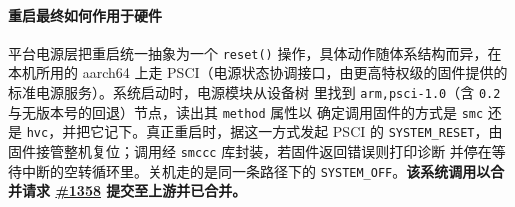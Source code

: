 \paragraph{重启最终如何作用于硬件}
平台电源层把重启统一抽象为一个 \texttt{reset()} 操作，具体动作随体系结构而异，在本机所用的 aarch64
上走 PSCI（电源状态协调接口，由更高特权级的固件提供的标准电源服务）。系统启动时，电源模块从设备树
里找到 \texttt{arm,psci-1.0}（含 \texttt{0.2} 与无版本号的回退）节点，读出其 \texttt{method} 属性以
确定调用固件的方式是 \texttt{smc} 还是 \texttt{hvc}，并把它记下。真正重启时，据这一方式发起 PSCI 的
\texttt{SYSTEM\_RESET}，由固件接管整机复位；调用经 \texttt{smccc} 库封装，若固件返回错误则打印诊断
并停在等待中断的空转循环里。关机走的是同一条路径下的 \texttt{SYSTEM\_OFF}。\textbf{该系统调用以合并请求
\href{https://github.com/rcore-os/tgoskits/pull/1358}{\#1358} 提交至上游并已合并。}
